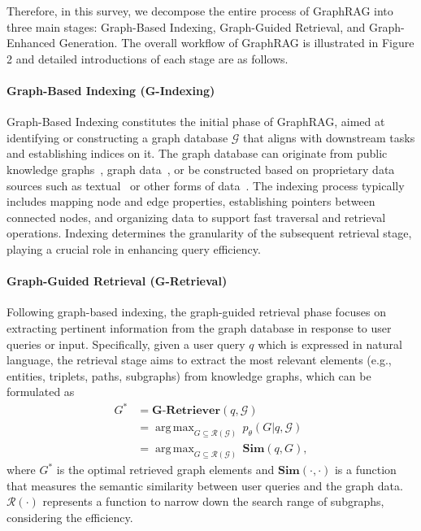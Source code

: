 \documentclass[acmsmall]{acmart}
\DeclareMathOperator*{\argmax}{arg\,max}
\begin{document}
Therefore, in this survey, we decompose the entire process of GraphRAG into three main stages: Graph-Based Indexing, Graph-Guided Retrieval, and Graph-Enhanced Generation. The overall workflow of GraphRAG is illustrated in Figure 2 and detailed introductions of each stage are as follows.

\paragraph{Graph-Based Indexing (G-Indexing)} 
\sloppy
Graph-Based Indexing constitutes the initial phase of GraphRAG, aimed at identifying or constructing a graph database $\mathcal{G}$ that aligns with downstream tasks and establishing indices on it. The graph database can originate from public knowledge graphs~\cite{ref:wikidata,ref:freebase,ref:dbpedia,ref:yago,ref:conceptnet,ref:atomic}, graph data~\cite{ref:tudataset}, or be constructed based on proprietary data sources such as textual~\cite{ref:graphrag,ref:dalk,ref:kgp,ref:hipporag} or other forms of data~\cite{ref:noname1}. The indexing process typically includes mapping node and edge properties, establishing pointers between connected nodes, and organizing data to support fast traversal and retrieval operations. Indexing determines the granularity of the subsequent retrieval stage, playing a crucial role in enhancing query efficiency.

\paragraph{Graph-Guided Retrieval (G-Retrieval)} 
Following graph-based indexing, the graph-guided retrieval phase focuses on extracting pertinent information from the graph database in response to user queries or input. Specifically, given a user query $q$ which is expressed in natural language, the retrieval stage aims to extract the most relevant elements (e.g., entities, triplets, paths, subgraphs) from knowledge graphs, which can be formulated as
\begin{equation}
    \begin{aligned}
        G^* &= \textbf{G-Retriever}(q, \mathcal{G}) \\
        &= \argmax_{G \subseteq \mathcal{R}(\mathcal{G})} \, p_\theta(G|q,\mathcal{G}) \\
        &= \argmax_{G \subseteq \mathcal{R}(\mathcal{G})} \, \textbf{Sim}(q, G),
    \end{aligned}
\end{equation}
where $G^*$ is the optimal retrieved graph elements and $\textbf{Sim}(\cdot,\cdot)$ is a function that measures the semantic similarity between user queries and the graph data. $\mathcal{R(\cdot)}$ represents a function to narrow down the search range of subgraphs, considering the efficiency.
\end{document}

